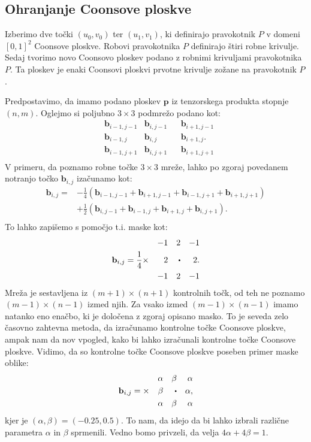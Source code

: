 \documentclass[a4paper,12pt]{article}
\begin{document}
\subsection{Ohranjanje Coonsove ploskve}

Izberimo dve točki $(u_0, v_0)$ ter $(u_1,v_1)$, ki definirajo pravokotnik $P$
v domeni $[0,1]^2$ Coonsove ploskve. 
Robovi pravokotnika $P$ definirajo štiri robne krivulje.
Sedaj tvorimo novo Coonsovo ploskev podano z robnimi krivuljami pravokotnika $P$.
Ta ploskev je enaki Coonsovi ploskvi prvotne krivulje zožane na pravokotnik $P$.

Predpostavimo, da imamo podano ploskev $\mathbf{p}$ iz tenzorskega produkta stopnje $(n,m)$.
Oglejmo si poljubno $3\times 3$ podmrežo podano kot:
\begin{align*}
      &\mathbf{b}_{i-1,j-1} &\mathbf{b}_{i,j-1}& &\mathbf{b}_{i+1,j-1} \\
      &\mathbf{b}_{i-1,j} &\mathbf{b}_{i,j}& &\mathbf{b}_{i+1,j}. \\
      &\mathbf{b}_{i-1,j+1} &\mathbf{b}_{i,j+1}& &\mathbf{b}_{i+1,j+1} \\ 
\end{align*}
V primeru, da poznamo robne točke $3\times 3$ mreže, lahko po zgoraj povedanem
notranjo točko $\mathbf{b}_{i,j}$ izačunamo kot:
\begin{align*}
   \mathbf{b}_{i,j} =&-\frac{1}{4}(\mathbf{b}_{i-1,j-1}+\mathbf{b}_{i+1,j-1}+\mathbf{b}_{i-1,j+1}+\mathbf{b}_{i+1,j+1}) \\
   &+\frac{1}{2}(\mathbf{b}_{i,j-1}+\mathbf{b}_{i-1,j}+\mathbf{b}_{i+1,j}+\mathbf{b}_{i,j+1}).\\
\end{align*}
To lahko zapišemo s pomočjo t.i. maske kot:
\begin{align*}
                                        & &-1  & &2 & &-1 \\
   &\mathbf{b}_{i,j}=\frac{1}{4} \times & 2 & & \sbullet & & 2 .\\
                                        & &-1 & &2 & &-1 \\ 
\end{align*}
Mreža je sestavljena iz $(m+1)\times(n+1)$ kontrolnih točk, od teh ne poznamo 
$(m-1)\times(n-1)$ izmed njih. 
Za vsako izmed $(m-1)\times(n-1)$ imamo natanko eno enačbo, ki je določena z zgoraj opisano masko.
To je seveda zelo časovno zahtevna metoda, da izračunamo kontrolne točke Coonsove ploskve,
ampak nam da nov vpogled, kako bi lahko izračunali kontrolne točke Coonsove ploskve.
Vidimo, da so kontrolne točke Coonsove ploskve poseben primer maske oblike:
\begin{align*}
   & &\alpha  & &\beta & &\alpha \\
&\mathbf{b}_{i,j}= \times & \beta & & \sbullet & & \alpha,\\
   & &\alpha & &\beta & &\alpha \\ 
\end{align*}
kjer je $(\alpha, \beta) = (-0.25, 0.5)$. To nam, da idejo da bi lahko izbrali različne 
parametra $\alpha$ in $\beta$ sprmenili. Vedno bomo privzeli, da velja $4\alpha + 4\beta = 1$.
\end{document}

